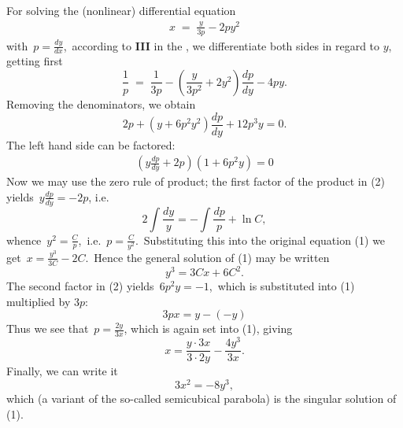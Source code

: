 \documentclass[12pt]{article}
\theoremstyle{definition}
\begin{document}
For solving the (nonlinear) differential equation 
\begin{align}
x \;=\; \frac{y}{3p}-2py^2
\end{align}
with\, $p = \frac{dy}{dx}$,\, according to \textbf{III} in the , we differentiate both sides in regard to $y$, getting first
$$\frac{1}{p} \;=\; \frac{1}{3p}-\left(\frac{y}{3p^2}+2y^2\right)\frac{dp}{dy}-4py.$$
Removing the denominators, we obtain
$$2p +(y+6p^2y^2)\frac{dp}{dy}+12p^3y = 0.$$
The left hand side can be factored:
\begin{align}
(y\frac{dp}{dy}+2p)(1+6p^2y) = 0
\end{align}
Now we may use the zero rule of product; the first factor of the product in (2) yields\, $y\frac{dp}{dy} = -2p$, i.e.
$$2\!\int\frac{dy}{y} = -\!\int\frac{dp}{p}+\ln{C},$$
whence\, $y^2 = \frac{C}{p}$,\, i.e.\, $p = \frac{C}{y^2}$.\, Substituting this into the original equation (1) we get\, $\displaystyle x = \frac{y^3}{3C}-2C$.\, Hence the general solution of (1) may be written
$$y^3 = 3Cx+6C^2.$$
The second factor in (2) yields\, $6p^2y = -1$,\, which is substituted into (1) multiplied by $3p$:
$$3px = y-(-y)$$
Thus we see that\, $p = \frac{2y}{3x}$, which is again set into (1), giving
$$x = \frac{y\cdot3x}{3\cdot2y}-\frac{4y^3}{3x}.$$
Finally, we can write it
$$3x^2 = -8y^3,$$
which (a variant of the so-called semicubical parabola) is the singular solution of (1).


\end{document}
